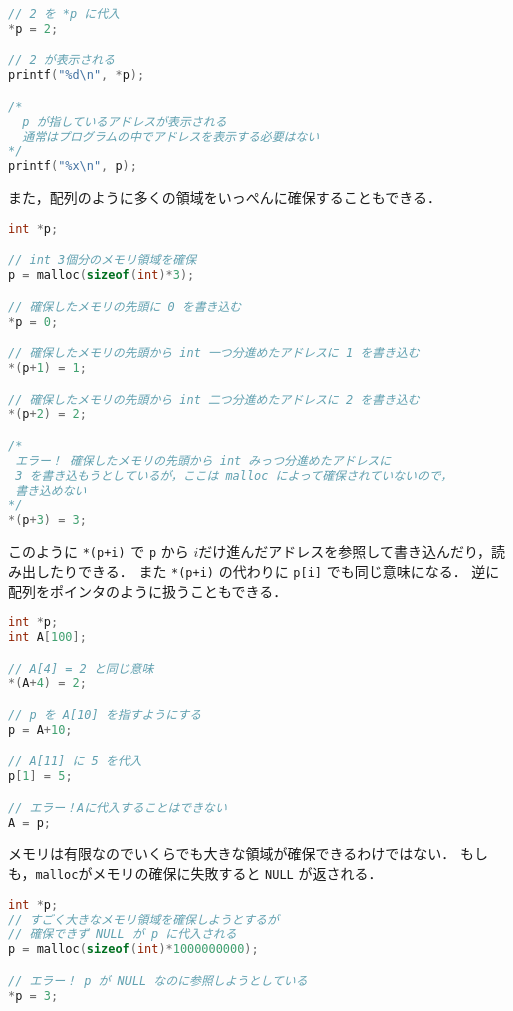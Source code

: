 \documentclass[a4paper,twoside,onecolumn,openany,article]{memoir}
\theoremstyle{remark}
\begin{document}
\begin{lstlisting}[basicstyle=\ttfamily\small,showstringspaces=false,language=C,frame=single]
// 2 を *p に代入
*p = 2;

// 2 が表示される
printf("%d\n", *p);

/*
  p が指しているアドレスが表示される
  通常はプログラムの中でアドレスを表示する必要はない
*/
printf("%x\n", p);
\end{lstlisting}
また，配列のように多くの領域をいっぺんに確保することもできる．
\begin{lstlisting}[basicstyle=\ttfamily\small,showstringspaces=false,language=C,frame=single]
int *p;

// int 3個分のメモリ領域を確保
p = malloc(sizeof(int)*3);

// 確保したメモリの先頭に 0 を書き込む
*p = 0;

// 確保したメモリの先頭から int 一つ分進めたアドレスに 1 を書き込む
*(p+1) = 1;

// 確保したメモリの先頭から int 二つ分進めたアドレスに 2 を書き込む
*(p+2) = 2;

/*
 エラー！ 確保したメモリの先頭から int みっつ分進めたアドレスに
 3 を書き込もうとしているが，ここは malloc によって確保されていないので，
 書き込めない
*/
*(p+3) = 3;
\end{lstlisting}
このように \texttt{*(p+i)} で \texttt{p} から $i$だけ進んだアドレスを参照して書き込んだり，読み出したりできる．
また \texttt{*(p+i)} の代わりに \texttt{p[i]} でも同じ意味になる．
逆に配列をポインタのように扱うこともできる．
\begin{lstlisting}[basicstyle=\ttfamily\small,showstringspaces=false,language=C,frame=single]
int *p;
int A[100];

// A[4] = 2 と同じ意味
*(A+4) = 2;

// p を A[10] を指すようにする
p = A+10;

// A[11] に 5 を代入
p[1] = 5;

// エラー！Aに代入することはできない
A = p;
\end{lstlisting}
メモリは有限なのでいくらでも大きな領域が確保できるわけではない．
もしも，\texttt{malloc}がメモリの確保に失敗すると \texttt{NULL} が返される．
\begin{lstlisting}[basicstyle=\ttfamily\small,showstringspaces=false,language=C,frame=single]
int *p;
// すごく大きなメモリ領域を確保しようとするが
// 確保できず NULL が p に代入される
p = malloc(sizeof(int)*1000000000);

// エラー！ p が NULL なのに参照しようとしている
*p = 3;
\end{lstlisting}
\end{document}
